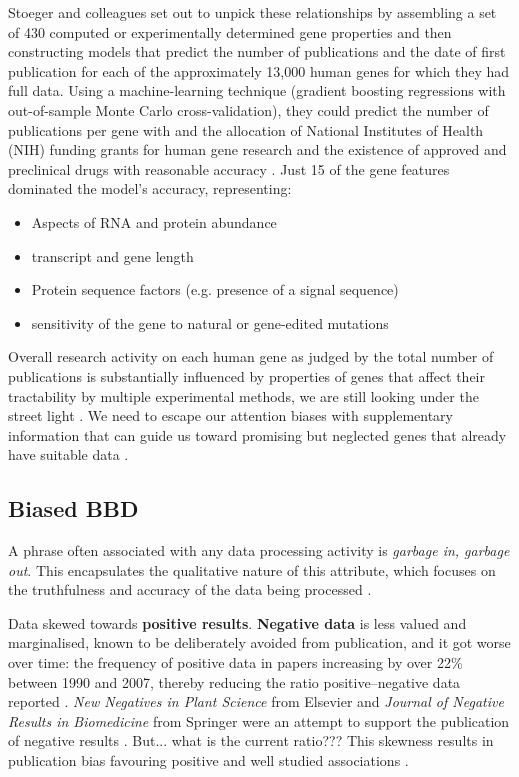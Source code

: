 Stoeger and colleagues \cite{stoeger2018} set out to unpick these relationships by assembling a set of 430 computed or experimentally determined gene properties and then constructing models that predict the number of publications and the date of first publication for each of the approximately 13,000 human genes for which they had full data. Using a machine-learning technique (gradient boosting regressions with out-of-sample Monte Carlo cross-validation), they could predict the number of publications per gene with and the allocation of National Institutes of Health (NIH) funding grants for human gene research and the existence of approved and preclinical drugs with reasonable accuracy \cite{stoeger2018}. Just 15 of the gene features dominated the model’s accuracy, representing:
\begin{itemize}
    \item Aspects of RNA and protein abundance
    \item transcript and gene length
    \item Protein sequence factors (e.g. presence of a signal sequence)
    \item sensitivity of the gene to natural or gene-edited mutations
\end{itemize}

Overall research activity on each human gene as judged by the total number of publications is substantially influenced by properties of genes that affect their tractability by multiple experimental methods, we are still looking under the street light \cite{stoeger2018}. We need to escape our attention biases with supplementary information that can guide us toward promising but neglected genes that already have suitable data \cite{dunham2019}.

\subsection{Biased BBD}
A phrase often associated with any data processing activity is \emph{garbage in, garbage out}. This encapsulates the qualitative nature of this attribute, which focuses on the truthfulness and accuracy of the data being processed \cite{brown2018}.

Data skewed towards \textbf{positive results}. \textbf{Negative data} is less valued and marginalised, known to be deliberately avoided from publication, and it got worse over time: the frequency of positive data in papers increasing by over 22\% between 1990 and 2007, thereby reducing the ratio positive--negative data reported  \cite{brown2018}. \emph{New Negatives in Plant Science} from Elsevier and \emph{Journal of Negative Results in Biomedicine} from Springer were an attempt to support the publication of negative results  \cite{brown2018}. But... what is the current ratio??? This skewness results in publication bias favouring positive and well studied associations \cite{brown2018}.

